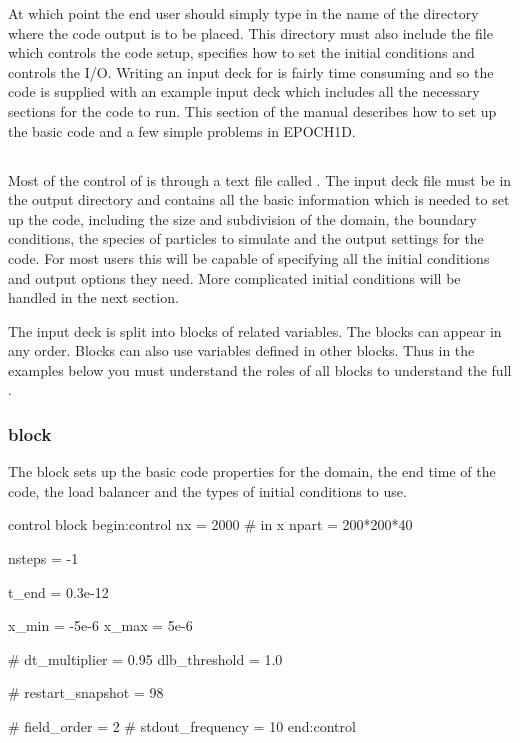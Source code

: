 At which point the end user should simply type in the name of the directory
where the code output is to be placed. This directory must also include the
file  which controls the code setup, specifies how to set the
initial conditions and controls the I/O. Writing an input deck for {\EPOCH} is
fairly time consuming and so the code is supplied with an example input deck
which includes all the necessary sections for the code to run. This section of
the manual describes how to set up the basic code and a few simple problems in
EPOCH1D.

\subsection{}
Most of the control of {\EPOCH} is through a text file called .
The input deck file must be in the output directory and contains all the basic
information which is needed to set up the code, including the size and
subdivision of the domain, the boundary conditions, the species of particles to
simulate and the output settings for the code. For most users this will be
capable of specifying all the initial conditions and output options they need.
More complicated initial conditions will be handled in the next section.

The input deck is split into blocks of related variables. The blocks can appear
in any order. Blocks can also use variables defined in other blocks. Thus in
the examples below you must understand the roles of all blocks to understand
the full .

\subsubsection{ block}
The  block sets up the basic code properties for the
domain, the end time of the code, the load balancer and the types of initial
conditions to use.

\begin{lboxverbatim}{control block}
begin:control
   nx = 2000 # in x
   npart = 200*200*40

   nsteps = -1

   t_end = 0.3e-12

   x_min = -5e-6
   x_max = 5e-6

   # dt_multiplier = 0.95
   dlb_threshold = 1.0

   # restart_snapshot = 98

   # field_order = 2
   # stdout_frequency = 10
end:control
\end{lboxverbatim}

